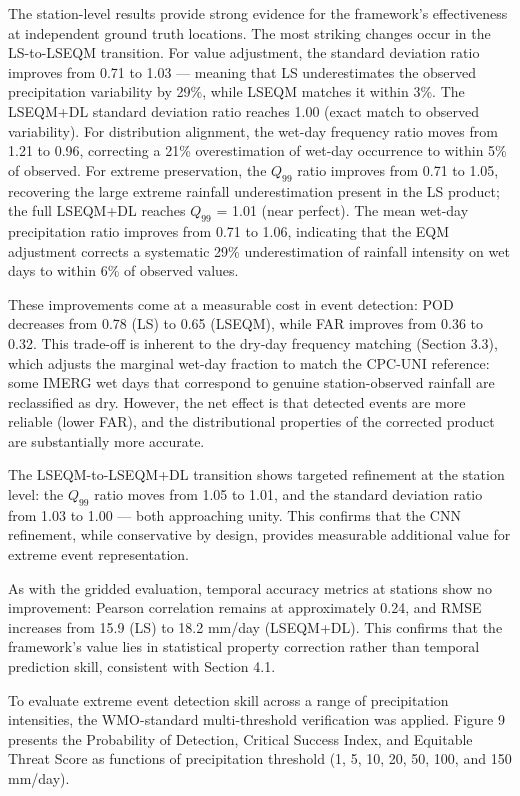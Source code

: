 \documentclass[remotesensing,article,submit,pdftex,moreauthors]{Definitions/mdpi}
\begin{document}
The station-level results provide strong evidence for the framework's
effectiveness at independent ground truth locations. The most striking
changes occur in the LS-to-LSEQM transition. For value adjustment, the
standard deviation ratio improves from 0.71 to 1.03 --- meaning that LS
underestimates the observed precipitation variability by 29\%, while
LSEQM matches it within 3\%. The LSEQM+DL standard deviation ratio
reaches 1.00 (exact match to observed variability). For distribution
alignment, the wet-day frequency ratio moves from 1.21 to 0.96,
correcting a 21\% overestimation of wet-day occurrence to within 5\% of
observed. For extreme preservation, the \(Q_{99}\) ratio improves from
0.71 to 1.05, recovering the large extreme rainfall underestimation
present in the LS product; the full LSEQM+DL reaches \(Q_{99}\) = 1.01
(near perfect). The mean wet-day precipitation ratio improves from 0.71
to 1.06, indicating that the EQM adjustment corrects a systematic 29\%
underestimation of rainfall intensity on wet days to within 6\% of
observed values.

These improvements come at a measurable cost in event detection: POD
decreases from 0.78 (LS) to 0.65 (LSEQM), while FAR improves from 0.36
to 0.32. This trade-off is inherent to the dry-day frequency matching
\cite{ref11} (Section 3.3), which adjusts the marginal wet-day fraction to
match the CPC-UNI reference: some IMERG wet days that correspond to
genuine station-observed rainfall are reclassified as dry. However, the
net effect is that detected events are more reliable (lower FAR), and
the distributional properties of the corrected product are substantially
more accurate.

The LSEQM-to-LSEQM+DL transition shows targeted refinement at the
station level: the \(Q_{99}\) ratio moves from 1.05 to 1.01, and the
standard deviation ratio from 1.03 to 1.00 --- both approaching unity.
This confirms that the CNN refinement, while conservative by design,
provides measurable additional value for extreme event representation.

As with the gridded evaluation, temporal accuracy metrics at stations
show no improvement: Pearson correlation remains at approximately 0.24,
and RMSE increases from 15.9 (LS) to 18.2 mm/day (LSEQM+DL). This
confirms that the framework's value lies in statistical property
correction rather than temporal prediction skill, consistent with
Section 4.1.

To evaluate extreme event detection skill across a range of
precipitation intensities, the WMO-standard multi-threshold verification
\cite{ref24} was applied. Figure 9 presents the Probability of Detection,
Critical Success Index, and Equitable Threat Score as functions of
precipitation threshold (1, 5, 10, 20, 50, 100, and 150 mm/day).
\end{document}

